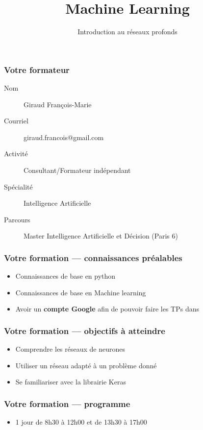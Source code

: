 \documentclass{formation}
\title{Machine Learning}
\subtitle{Introduction au réseaux profonds}
\begin{document}
\maketitle

\begin{frame}
  \frametitle{Votre formateur}
  \begin{description}
  \item[Nom] Giraud François-Marie
  \item[Courriel] giraud.francois@gmail.com
  \item[Activité] Consultant/Formateur indépendant
  \item[Spécialité] Intelligence Artificielle
  \item[Parcours] Master Intelligence Artificielle et Décision (Paris 6)
  \end{description}
\end{frame}

\begin{frame}
  \frametitle{Votre formation — connaissances préalables}
  \begin{itemize}
  \item Connaissances de base en python
  \item Connaissances de base en Machine learning
  \item Avoir un \textbf{compte Google} afin de pouvoir faire les TPs dans 
  \end{itemize}
\end{frame}

\begin{frame}
  \frametitle{Votre formation — objectifs à atteindre}
  \begin{itemize}
  \item Comprendre les réseaux de neurones
  \item Utiliser un réseau adapté à un problème donné
  \item Se familiariser avec la librairie Keras
  \end{itemize}
\end{frame}

\begin{frame}
  \frametitle{Votre formation — programme}
  \begin{itemize}
  \item 1 jour de 8h30 à 12h00 et de 13h30 à 17h00
  \end{itemize}
\end{frame}
\end{document}
